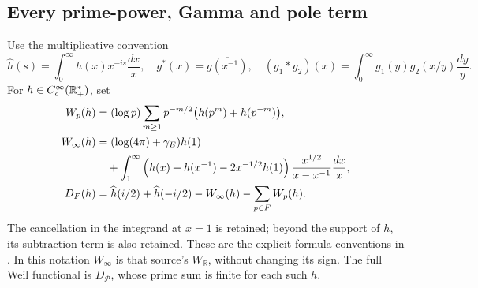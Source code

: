 \documentclass[11pt,a4paper]{article}
\theoremstyle{definition}\newtheorem{definition}[theorem]{Definition}
\begin{document}
\subsection{Every prime-power, Gamma and pole term}
Use the multiplicative convention
\[
 \widehat h(s)=\int_0^\infty h(x)x^{-is}\frac{dx}{x},\quad
 g^*(x)=\overline{g(x^{-1})},\quad
 (g_1*g_2)(x)=\int_0^\infty g_1(y)g_2(x/y)\frac{dy}{y}.
\]
For $h\in C_c^\infty(\mathbb R_+^*)$, set
\begin{align}
 W_p(h)&=(\log p)\sum_{m\ge1}p^{-m/2}\bigl(h(p^m)+h(p^{-m})\bigr),\label{eq:rebuilt-Wp}\\
 W_\infty(h)&=(\log(4\pi)+\gamma_E)h(1)\notag\\
 &\quad+\int_1^\infty\left(h(x)+h(x^{-1})-2x^{-1/2}h(1)\right)
 \frac{x^{1/2}}{x-x^{-1}}\frac{dx}{x},\label{eq:rebuilt-Winf}\\
 D_F(h)&=\widehat h(i/2)+\widehat h(-i/2)-W_\infty(h)-\sum_{p\in F}W_p(h).
 \label{eq:rebuilt-D}
\end{align}
The cancellation in the integrand at $x=1$ is retained; beyond the support of $h$, its subtraction term is also retained. These are the explicit-formula conventions in \cite[\texttt{wp}, \texttt{arch}, \texttt{sectweilpos}]{Connes2026}. In this notation $W_\infty$ is that source's $W_{\mathbb R}$, without changing its sign. The full Weil functional is $D_{\mathcal P}$, whose prime sum is finite for each such $h$.
\end{document}
